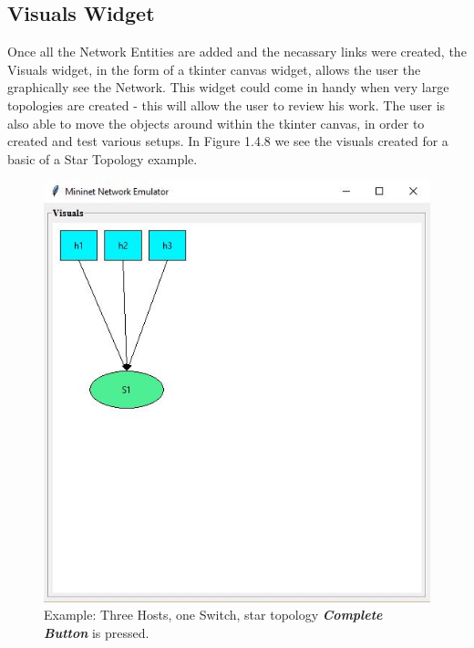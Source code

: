 \subsection{Visuals Widget}
Once all the Network Entities are added and the necassary links were created, the Visuals widget, in the form of a tkinter canvas widget, allows the user the graphically see the Network. This widget could come in handy when very large topologies are created - this will allow the user to review his work. The user is also able to move the objects around within the tkinter canvas, in order to created and test various setups. In Figure 1.4.8 we see the visuals created for a basic of a Star Topology example.
\begin{figure}[H]
    \centering
    \includegraphics[scale=0.5]{Visuals}
    \caption{Example: Three Hosts, one Switch, star topology \textbf{\textit{Complete Button}} is pressed. }
\end{figure}
